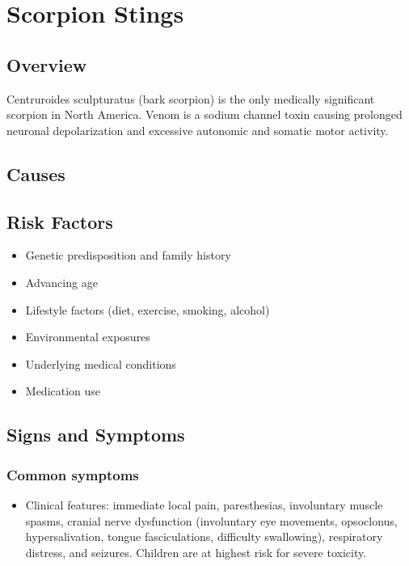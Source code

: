 \chapter{Scorpion Stings}
\label{sec:Scorpion Stings}

\section{Overview}
Centruroides sculpturatus (bark scorpion) is the only medically significant scorpion in North America. Venom is a sodium channel toxin causing prolonged neuronal depolarization and excessive autonomic and somatic motor activity.
\section{Causes}
\section{Risk Factors}

\begin{itemize}[noitemsep]
  \item Genetic predisposition and family history
  \item Advancing age
  \item Lifestyle factors (diet, exercise, smoking, alcohol)
  \item Environmental exposures
  \item Underlying medical conditions
  \item Medication use
\end{itemize}
\section{Signs and Symptoms}

\subsection{Common symptoms}
\begin{itemize}[noitemsep]
  \item Clinical features: immediate local pain, paresthesias, involuntary muscle spasms, cranial nerve dysfunction (involuntary eye movements, opsoclonus, hypersalivation, tongue fasciculations, difficulty swallowing), respiratory distress, and seizures. Children are at highest risk for severe toxicity. 
  \end{itemize}

